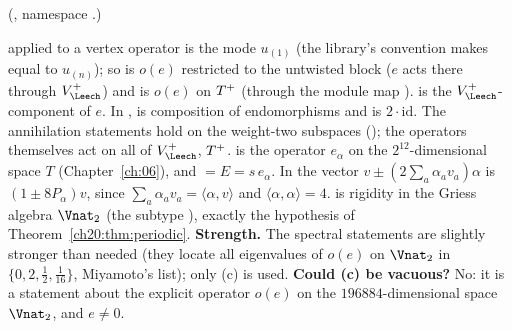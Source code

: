 (, namespace .)
\begin{dictionary}
 applied to a vertex operator is the mode $u_{(1)}$ (the library's convention 
makes  equal to $u_{(n)}$); so  is $o(e)$ restricted to the untwisted block
($e$ acts there through $\chtwentyVL$) and  is $o(e)$ on $T^{+}$ (through the module map
).   is the $\chtwentyVL$-component of $e$.  In
, \lean{*} is composition of endomorphisms and  is $2\cdot\mathrm{id}$.  The
annihilation statements hold on the weight-two subspaces (); the operators themselves act on all of
$\chtwentyVL$, $T^{+}$.   is the operator $e_\alpha$ on the $2^{12}$-dimensional space $T$
(Chapter~\ref{ch:06}), and  $=E=s\,e_\alpha$.  In  the vector
$v\pm(2\sum_a\alpha_av_a)\alpha$ is $(1\pm8P_\alpha)v$, since $\sum_a\alpha_av_a=\langle\alpha,v\rangle$ and $\langle\alpha,\alpha\rangle=4$.
 is rigidity in the Griess algebra $\Vnat_2$ (the subtype ), exactly the
hypothesis  of Theorem~\ref{ch20:thm:periodic}.  \textbf{Strength.}  The spectral statements are slightly
stronger than needed (they locate all eigenvalues of $o(e)$ on $\Vnat_2$ in $\{0,2,\tfrac12,\tfrac1{16}\}$, Miyamoto's
list); only (c) is used.  \textbf{Could (c) be vacuous?}  No: it is a statement about the explicit operator $o(e)$ on the
$196884$-dimensional space $\Vnat_2$, and $e\ne0$.
\end{dictionary}

